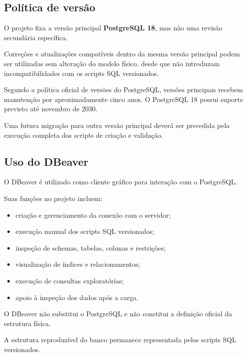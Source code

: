\documentclass[12pt,a4paper]{article}
\begin{document}
	\subsection{Política de versão}
	
	O projeto fixa a versão principal \textbf{PostgreSQL 18}, mas não uma
	revisão secundária específica.
	
	Correções e atualizações compatíveis dentro da mesma versão principal
	podem ser utilizadas sem alteração do modelo físico, desde que não
	introduzam incompatibilidades com os scripts SQL versionados.
	
	Segundo a política oficial de versões do PostgreSQL, versões principais
	recebem manutenção por aproximadamente cinco anos. O PostgreSQL 18
	possui suporte previsto até novembro de 2030.
	
	Uma futura migração para outra versão principal deverá ser precedida
	pela execução completa dos scripts de criação e validação.
	
	\subsection{Uso do DBeaver}
	
	O DBeaver é utilizado como cliente gráfico para interação com o
	PostgreSQL.
	
	Suas funções no projeto incluem:
	
	\begin{itemize}[leftmargin=1.2cm]
		\item criação e gerenciamento da conexão com o servidor;
		\item execução manual dos scripts SQL versionados;
		\item inspeção de schemas, tabelas, colunas e restrições;
		\item visualização de índices e relacionamentos;
		\item execução de consultas exploratórias;
		\item apoio à inspeção dos dados após a carga.
	\end{itemize}
	
	O DBeaver não substitui o PostgreSQL e não constitui a definição
	oficial da estrutura física.
	
	A estrutura reproduzível do banco permanece representada pelos scripts
	SQL versionados.
	
\end{document}

